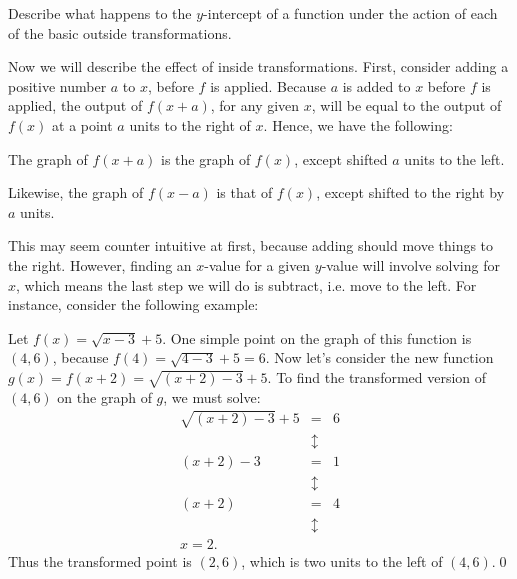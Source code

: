 \par

\begin{question} Describe what happens to the $y$-intercept of a function under the action of each of the basic outside transformations.
\end{question}

\par

Now we will describe the effect of inside transformations. First, consider adding a positive number $a$ to $x$, before $f$ is applied. Because $a$ is added to $x$ before $f$ is applied, the output of $f(x+a)$, for any given $x$, will be equal to the output of $f(x)$ at a point $a$ units to the right of $x$. Hence, we have the following:
\\
\begin{center}
The graph of $f(x+a)$ is the graph of $f(x)$, except shifted $a$ units to the left.\\
\end{center}
Likewise, the graph of $f(x-a)$ is that of $f(x)$, except shifted to the right by $a$ units.

\par

This may seem counter intuitive at first, because adding should move things to the right. However, finding an $x$-value for a given $y$-value will involve solving for $x$, which means the last step we will do is subtract, i.e. move to the left. For instance, consider the following example:

\par 

\begin{eg} Let $f(x) = \sqrt{x-3} + 5$. One simple point on the graph of this function is $(4,6)$, because $f(4) = \sqrt{4-3} + 5 = 6$. Now let's consider the new function $g(x) = f(x+2) = \sqrt{(x+2)-3} + 5$. To find the transformed version of $(4,6)$ on the graph of $g$, we must solve:
\begin{eqnarray*}
\sqrt{(x+2) - 3} + 5 & = & 6\\
& \updownarrow & \\
(x+2) - 3 & = & 1\\
& \updownarrow & \\
(x+2) & = & 4\\
& \updownarrow & \\
x = 2.
\end{eqnarray*}
Thus the transformed point is $(2,6)$, which is two units to the left of $(4,6)$.\qed \end{eg}


